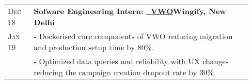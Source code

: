 \documentclass[a4paper,10pt]{extarticle} %
\begin{document}
\begin{tabularx}{\linewidth}{ l | X }
\textsc{Dec 18} & \textbf{Sofware Engineering Intern: {\href{https://vwo.com/}{\ VWO}}}\hfill\textbf{Wingify, New Delhi}\\
\textsc{Jan 19}& {- Dockerised core components of VWO reducing migration and production setup time by 80\%.}\\
& {- Optimized data queries and reliability with UX changes reducing the campaign creation dropout rate by 30\%.}\\

\end{tabularx}

\vspace{-0.3cm}
\end{document}
